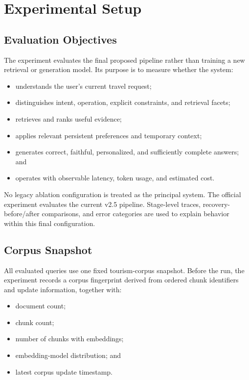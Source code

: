 \chapter{Experimental Setup}
\label{chap:experimental-setup}

\section{Evaluation Objectives}

The experiment evaluates the final proposed pipeline rather than training a new
retrieval or generation model. Its purpose is to measure whether the system:

\begin{itemize}
    \item understands the user's current travel request;
    \item distinguishes intent, operation, explicit constraints, and retrieval
    facets;
    \item retrieves and ranks useful evidence;
    \item applies relevant persistent preferences and temporary context;
    \item generates correct, faithful, personalized, and sufficiently complete
    answers; and
    \item operates with observable latency, token usage, and estimated cost.
\end{itemize}

No legacy ablation configuration is treated as the principal system. The
official experiment evaluates the current v2.5 pipeline. Stage-level traces,
recovery-before/after comparisons, and error categories are used to explain
behavior within this final configuration.

\section{Corpus Snapshot}

All evaluated queries use one fixed tourism-corpus snapshot. Before the run, the
experiment records a corpus fingerprint derived from ordered chunk identifiers
and update information, together with:

\begin{itemize}
    \item document count;
    \item chunk count;
    \item number of chunks with embeddings;
    \item embedding-model distribution; and
    \item latest corpus update timestamp.
\end{itemize}

